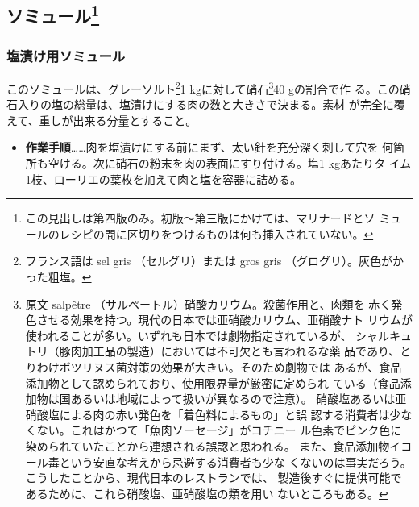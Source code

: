 \hypertarget{saumures}{%
\subsection[ソミュール]{\texorpdfstring{ソミュール\footnote{この見出しは第四版のみ。初版〜第三版にかけては、マリナードとソ
  ミュールのレシピの間に区切りをつけるものは何も挿入されていない。}}{ソミュール}}\label{saumures}}


 
\begin{recette}
\hypertarget{saumure-au-sel}{%
\subsubsection{塩漬け用ソミュール}\label{saumure-au-sel}}



このソミュールは、グレーソルト\footnote{フランス語は sel gris
  （セルグリ）または gros gris （グログリ）。灰色がかった粗塩。}1
kgに対して硝石\footnote{原文 salpêtre
  （サルペートル）硝酸カリウム。殺菌作用と、肉類を
  赤く発色させる効果を持つ。現代の日本では亜硝酸カリウム、亜硝酸ナト
  リウムが使われることが多い。いずれも日本では劇物指定されているが、
  シャルキュトリ（豚肉加工品の製造）においては不可欠とも言われるな薬
  品であり、とりわけボツリヌス菌対策の効果が大きい。そのため劇物では
  あるが、食品添加物として認められており、使用限界量が厳密に定められ
  ている（食品添加物は国あるいは地域によって扱いが異なるので注意）。
  硝酸塩あるいは亜硝酸塩による肉の赤い発色を「着色料によるもの」と誤
  認する消費者は少なくない。これはかつて「魚肉ソーセージ」がコチニー
  ル色素でピンク色に染められていたことから連想される誤認と思われる。
  また、食品添加物イコール毒という安直な考えから忌避する消費者も少な
  くないのは事実だろう。こうしたことから、現代日本のレストランでは、
  製造後すぐに提供可能であるために、これら硝酸塩、亜硝酸塩の類を用い
  ないところもある。}40 gの割合で作
る。この硝石入りの塩の総量は、塩漬けにする肉の数と大きさで決まる。素材
が完全に覆えて、重しが出来る分量とすること。

\begin{itemize}
\tightlist
\item
  \textbf{作業手順}\ldots{}\ldots{}肉を塩漬けにする前にまず、太い針を充分深く刺して穴を
  何箇所も空ける。次に硝石の粉末を肉の表面にすり付ける。塩1 kgあたりタ
  イム1枝、ローリエの葉\undemi{}枚を加えて肉と塩を容器に詰める。
\end{itemize}


\end{recette}
